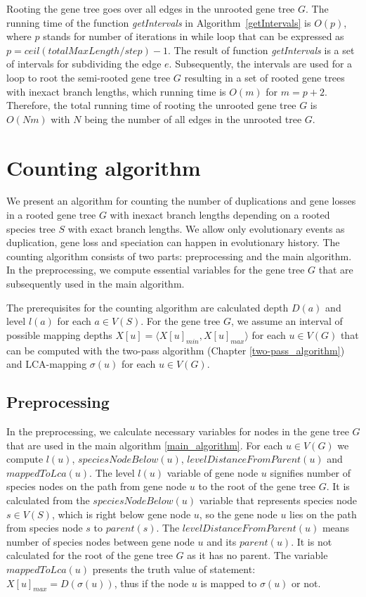 Rooting the gene tree goes over all edges in the unrooted gene tree $G$. The running time of the function \emph{getIntervals} in Algorithm~\ref{getIntervals} is $O(p)$, where $p$ stands for number of iterations in while loop that can be expressed as $p = ceil(totalMaxLength/step) - 1$. The result of function \emph{getIntervals} is a set of intervals for subdividing the edge $e$. Subsequently, the intervals are used for a loop to root the semi-rooted gene tree $G$ resulting in a set of rooted gene trees with inexact branch lengths, which running time is $O(m)$ for $m = p+2$. Therefore, the total running time of rooting the unrooted gene tree $G$ is $O(Nm)$ with $N$ being the number of all edges in the unrooted tree $G$.


\section{Counting algorithm} \label{counting_algorithm}

We present an algorithm for counting the number of duplications and gene losses in a rooted gene tree $G$ with inexact branch lengths depending on a rooted species tree $S$ with exact branch lengths. We allow only evolutionary events as duplication, gene loss and speciation can happen in evolutionary history. The counting algorithm consists of two parts: preprocessing and the main algorithm. In the preprocessing, we compute essential variables for the gene tree $G$ that are subsequently used in the main algorithm.

The prerequisites for the counting algorithm are calculated depth $D(a)$ and level $l(a)$ for each $a \in V(S)$. For the gene tree $G$, we assume an interval of possible mapping depths $X[u] = \langle X[u]_{min}, X[u]_{max} \rangle$ for each $u \in V(G)$ that can be computed with the two-pass algorithm (Chapter \ref{two-pass_algorithm}) and LCA-mapping $\sigma(u)$ for each $u \in V(G)$.

\subsection{Preprocessing} \label{preprocessing}

In the preprocessing, we calculate necessary variables for nodes in the gene tree $G$ that are used in the main algorithm \ref{main_algorithm}. For each $u \in V(G)$ we compute $l(u)$, $speciesNodeBelow(u)$, $levelDistanceFromParent(u)$ and $mappedToLca(u)$. The level $l(u)$ variable of gene node $u$ signifies number of species nodes on the path from gene node $u$ to the root of the gene tree $G$. It is calculated from the $speciesNodeBelow(u)$ variable that represents species node $s \in V(S)$, which is right below gene node $u$, so the gene node $u$ lies on the path from species node $s$ to $parent(s)$. The $levelDistanceFromParent(u)$ means number of species nodes between gene node $u$ and its $parent(u)$. It is not calculated for the root of the gene tree $G$ as it has no parent. The variable $mappedToLca(u)$ presents the truth value of statement: $X[u]_{max} = D(\sigma(u))$, thus if the node $u$ is mapped to $\sigma(u)$ or not. 

